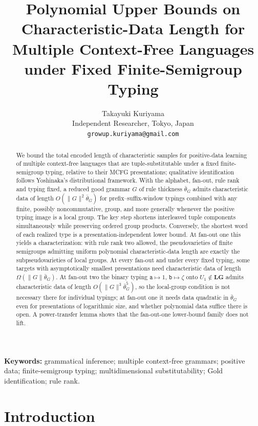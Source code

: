 \documentclass[11pt]{article}
\title{Polynomial Upper Bounds on Characteristic-Data Length for Multiple Context-Free Languages under Fixed Finite-Semigroup Typing}
\author{Takayuki Kuriyama\\
Independent Researcher, Tokyo, Japan\\
\texttt{growup.kuriyama@gmail.com}}
\date{}
\numberwithin{equation}{section}
\theoremstyle{plain}
\theoremstyle{definition}
\theoremstyle{remark}
\begin{document}
\maketitle

\begin{abstract}
We bound the total encoded length of characteristic samples for
positive-data learning of multiple context-free languages that are
tuple-substitutable under a fixed finite-semigroup typing, relative to
their MCFG presentations; qualitative identification follows Yoshinaka's
distributional framework.  With the alphabet, fan-out, rule rank and
typing fixed, a reduced good grammar $G$ of rule thickness $\bar\theta_G$
admits characteristic data of length $O(\|G\|^2\bar\theta_G)$ for
prefix--suffix-window typings combined with any finite, possibly
noncommutative, group, and more generally whenever the positive typing image
is a local group.  The key step shortens interleaved tuple components
simultaneously while preserving ordered group products.
Conversely, the shortest word of each realized type is a
presentation-independent lower bound.  At fan-out one this yields a
characterization: with rule rank two allowed, the pseudovarieties of finite
semigroups admitting uniform polynomial characteristic-data length are
exactly the subpseudovarieties of local groups.  At every fan-out and under
every fixed typing, some targets with asymptotically smallest presentations need
characteristic data of length $\Omega(\|G\|\bar\theta_G)$.  At fan-out two the
binary typing $\mathtt a\mapsto1$, $\mathtt b\mapsto\zeta$ onto
$U_1\notin\mathbf{LG}$ admits characteristic data of length
$O(\|G\|^3\bar\theta_G^5)$, so the local-group condition is not necessary there
for individual typings; at fan-out one it needs data quadratic in
$\bar\theta_G$ even for presentations of logarithmic size, and whether polynomial
data suffice there is open.  A power-transfer lemma shows that the fan-out-one lower-bound
family does not lift.
\end{abstract}

\medskip
\noindent\textbf{Keywords:} grammatical inference; multiple context-free grammars; positive data; finite-semigroup typing; multidimensional substitutability; Gold identification; rule rank.
\medskip

\section{Introduction}
\label{sec:introduction}
\end{document}
